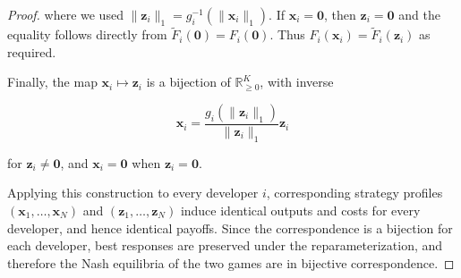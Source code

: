 \begin{proof}
where we used $\lVert \mathbf{z}_i\rVert_1 = g_i^{-1}(\lVert \mathbf{x}_i\rVert_1)$. If $\mathbf{x}_i=\mathbf{0}$, then $\mathbf{z}_i=\mathbf{0}$ and the equality follows directly from $\tilde F_i(\mathbf{0})=F_i(\mathbf{0})$. Thus $F_i(\mathbf{x}_i)=\tilde F_i(\mathbf{z}_i)$ as required.

Finally, the map $\mathbf{x}_i\mapsto\mathbf{z}_i$ is a bijection of $\mathbb{R}_{\ge0}^K$, with inverse

$$
\mathbf{x}_i = \frac{g_i(\lVert \mathbf{z}_i\rVert_1)}{\lVert \mathbf{z}_i\rVert_1}\mathbf{z}_i
$$

for $\mathbf{z}_i\neq\mathbf{0}$, and $\mathbf{x}_i=\mathbf{0}$ when $\mathbf{z}_i=\mathbf{0}$.

Applying this construction to every developer $i$, corresponding strategy profiles $(\mathbf{x}_1,\ldots,\mathbf{x}_N)$ and $(\mathbf{z}_1,\ldots,\mathbf{z}_N)$ induce identical outputs and costs for every developer, and hence identical payoffs. Since the correspondence is a bijection for each developer, best responses are preserved under the reparameterization, and therefore the Nash equilibria of the two games are in bijective correspondence.
\end{proof}


